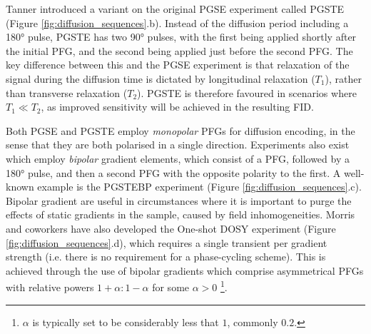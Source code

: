 Tanner introduced a variant on the original \ac{PGSE} experiment called
\ac{PGSTE}\cite{Tanner1970} (Figure \ref{fig:diffusion_sequences}.b). Instead
of the diffusion period including a
\ang{180} pulse, \ac{PGSTE} has two \ang{90} pulses, with the first being
applied shortly after the initial \ac{PFG}, and the second being applied just
before the second \ac{PFG}. The key difference between this and the \ac{PGSE}
experiment is that relaxation of the signal during the diffusion time is
dictated by longitudinal relaxation ($T_1$), rather than transverse relaxation
($T_2$). \ac{PGSTE} is therefore favoured in scenarios where $T_1 \ll T_2$, as
improved sensitivity will be achieved in the resulting \ac{FID}.


Both \ac{PGSE} and \ac{PGSTE} employ \emph{monopolar} \acp{PFG} for diffusion
encoding, in the sense that they are both polarised in a
single direction. Experiments also exist which employ
\emph{bipolar} gradient elements\cite{Cotts1989,Wu1995}, which consist of a
\ac{PFG}, followed by a \ang{180} pulse, and then a second \ac{PFG} with the
opposite polarity to the first. A well-known example is the \ac{PGSTEBP}
experiment (Figure \ref{fig:diffusion_sequences}.c). Bipolar gradient are
useful in circumstances where it is important to purge the effects of static
gradients in the sample, caused by field inhomogeneities. Morris and coworkers
have also developed the One-shot DOSY experiment\cite{Pelta2002} (Figure
\ref{fig:diffusion_sequences}.d), which requires a single transient per
gradient strength (i.e. there is no requirement for a phase-cycling scheme).
This is achieved through the use of bipolar gradients which comprise
asymmetrical \acp{PFG} with relative powers $1 + \alpha : 1 - \alpha$ for some
$\alpha > 0$
\footnote{
    $\alpha$ is typically set to be considerably less that $1$, commonly $0.2$.
}.

